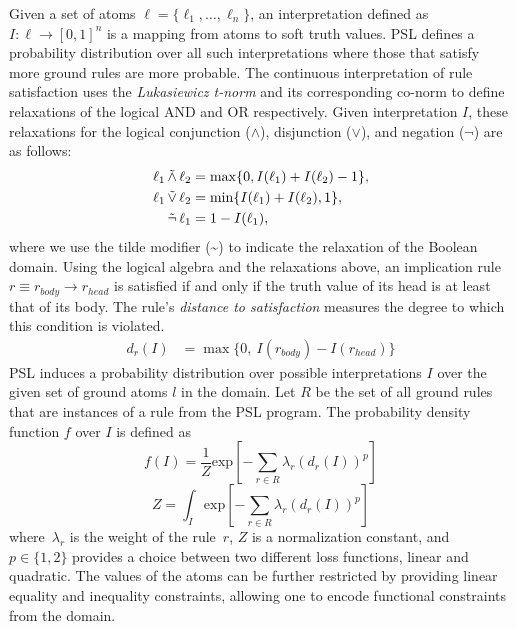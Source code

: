 Given a set of atoms 
$\ell = \{\ell_1,\ldots,\ell_n\}$,
an interpretation defined as 
$I : \ell \rightarrow [0,1]^n$
is a mapping from atoms to soft truth values.
PSL defines a probability distribution over all such interpretations where those that satisfy more ground rules are more probable.
The continuous interpretation of rule satisfaction uses the \emph{Lukasiewicz t-norm} and its corresponding co-norm to define relaxations of the logical AND and OR respectively.
Given interpretation $\mathit{I}$, these relaxations for the logical conjunction ($\wedge$), disjunction ($\vee$), and negation ($\neg$) are as follows:
\begin{align*}
\ell_1 \softand \ell_2 &= \max\{0, I(\ell_1) + I(\ell_2) - 1\},\\
\ell_1 \softor \ell_2 &= \min\{I(\ell_1) + I(\ell_2), 1\},\\
\softneg \ell_1 &= 1 - I(\ell_1),
\end{align*}  
where we use the tilde modifier (\textasciitilde) to indicate the relaxation of the Boolean domain.
Using the logical algebra and the relaxations above, 
an implication rule $r \equiv r_{\mathit{body}} \rightarrow r_{\mathit{head}} $ is satisfied if and only if the truth value of its head is at least that of its body. The rule's \emph{distance to satisfaction} measures the degree to which this condition is violated.
\begin{align*} 
d_r(I) &= \max\{0, ~ I(r_{\mathit{body}}) - I(r_{\mathit{head}})\}
 \end{align*}
PSL induces a probability distribution over possible interpretations $I$ over the given set of ground atoms $l$ in the domain. 
Let $R$ be the set of all ground rules that are instances of a rule from the PSL program.  
The probability density function $f$ over $I$ is defined as
\begin{equation}
\label{eq:contimn1}
    f (I) = \frac{1}{Z} \text{exp}[-\sum_{r\in R} \lambda_r (d_r(I))^p]
\end{equation}
\begin{equation}
\label{eq:contimn2}
	Z = \int_{I} \text{exp} [ -\sum_{r\in R} \lambda_r (d_r(I))^p ]
\end{equation}
where~$\lambda_r$ is the weight of the rule~$r$, $Z$ is a normalization constant, and ~$p \in \{1, 2\}$ provides a choice between two different loss functions, linear and quadratic.
The values of the atoms can be further restricted by providing linear equality and inequality constraints, allowing one to encode functional constraints from the domain.

